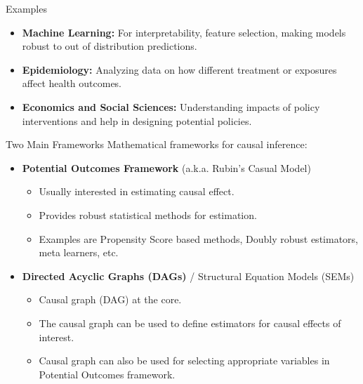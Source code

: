 \documentclass[aspectratio=169]{beamer}
\begin{document}
\begin{frame}{Examples}
	\begin{itemize}
		\item \textbf{Machine Learning:} For interpretability, feature selection, making models robust to out of distribution predictions.
		\item \textbf{Epidemiology:} Analyzing data on how different treatment or exposures affect health outcomes.
		\item \textbf{Economics and Social Sciences:} Understanding impacts of policy interventions and help in designing potential policies.
	\end{itemize}
\end{frame}

\begin{frame}{Two Main Frameworks}
	Mathematical frameworks for causal inference:
	\vspace{1em}
	\begin{itemize}
		\item \textbf{Potential Outcomes Framework} (a.k.a. Rubin's Casual Model)
			\begin{itemize}
				\item Usually interested in estimating causal effect.
				\item Provides robust statistical methods for estimation.
				\item Examples are Propensity Score based methods, Doubly robust estimators, meta learners, etc.
			\end{itemize}
	\end{itemize}
	\vspace{2em}
	\begin{itemize}
		\item \textbf{Directed Acyclic Graphs (DAGs)} / Structural Equation Models (SEMs)
			\begin{itemize}
				\item Causal graph (DAG) at the core.
				\item The causal graph can be used to define estimators for causal effects of interest.
				\item Causal graph can also be used for selecting appropriate variables in Potential Outcomes framework.
			\end{itemize}
	\end{itemize}
\end{frame}
\end{document}
